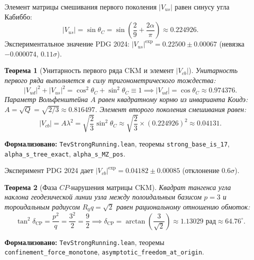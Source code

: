 \documentclass[11pt,a4paper]{article}
\newtheorem{theorem}{Теорема}
\theoremstyle{definition}
\theoremstyle{remark}
\begin{document}
Элемент матрицы смешивания первого поколения $|V_{us}|$ равен синусу угла Кабиббо:
\begin{equation}
	|V_{us}| = \sin\theta_C = \sin\left(\frac{2}{9} + \frac{2\alpha}{\pi}\right) \approx 0.224926.
	\label{eq:V_us_exact}
\end{equation}
Экспериментальное значение PDG 2024: $|V_{us}|^{\mathrm{exp}} = 0.22500 \pm 0.00067$ (невязка $-0.000074$, $0.11\sigma$).
	
\begin{theorem}[Унитарность первого ряда CKM и элемент $|V_{cb}|$]
\label{thm:wolfenstein_cb}
Унитарность первого ряда выполняется в силу тригонометрического тождества:
\begin{equation}
	|V_{ud}|^2 + |V_{us}|^2 = \cos^2\theta_C + \sin^2\theta_C \equiv 1 \implies |V_{ud}| = \cos\theta_C \approx 0.974376.
	\label{eq:V_ud_exact}
\end{equation}
	Параметр Вольфенштейна $A$ равен квадратному корню из инварианта Коидэ: $A = \sqrt{Q} = \sqrt{2/3} \approx 0.816497$. Элемент второго поколения смешивания равен:
\begin{equation}
	|V_{cb}| = A \lambda^2 = \sqrt{\frac{2}{3}} \sin^2\theta_C \approx \sqrt{\frac{2}{3}} \times (0.224926)^2 \approx 0.04131.
	\label{eq:V_cb_exact}
\end{equation}
\end{theorem}

\noindent\small\textbf{Формализовано:} \texttt{TevStrongRunning.lean}, теоремы \texttt{strong_base_is_17}, \texttt{alpha_s_tree_exact}, \texttt{alpha_s_MZ_pos}.

Эксперимент PDG 2024 дает $|V_{cb}|^{\mathrm{exp}} = 0.04182 \pm 0.00085$ (отклонение $0.6\sigma$).

\begin{theorem}[Фаза $CP$-нарушения матрицы CKM]
\label{thm:delta_cp_exact}
Квадрат тангенса угла наклона геодезической линии узла между полоидальным базисом $p=3$ и тороидальным радиусом $R_0 q = \sqrt{2}$ равен рациональному отношению обмоток:
\begin{equation}
	\tan^2\delta_{\mathrm{CP}} = \frac{p^2}{q} = \frac{3^2}{2} = \frac{9}{2} \implies \delta_{\mathrm{CP}} = \arctan\left(\frac{3}{\sqrt{2}}\right) \approx 1.13029\text{ рад} \approx 64.76^\circ.
\label{eq:delta_cp_exact}
\end{equation}
\end{theorem}

\noindent\small\textbf{Формализовано:} \texttt{TevStrongRunning.lean}, теоремы \texttt{confinement_force_monotone}, \texttt{asymptotic_freedom_at_origin}.
\end{document}
